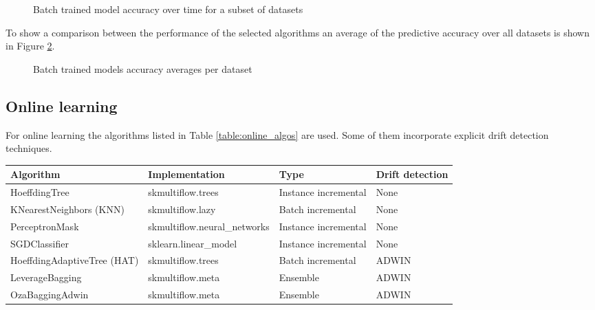 \documentclass{sig-alternate-br}
\begin{document}
\begin{figure}[h]
\centering 
{}
\caption{Batch trained model accuracy over time for a subset of datasets}
\label{fig:batchdt}
\end{figure}

To show a comparison between the performance of the selected algorithms an average of the predictive accuracy over all datasets is shown in Figure \ref{fig:batch_violins}.

\vspace{3cm}

\begin{figure}[h]
\centering 
{}
\caption{Batch trained models accuracy averages per dataset}
\label{fig:batch_violins}
\end{figure}

\subsection{Online learning}

For online learning the algorithms listed in Table \ref{table:online_algos} are used. Some of them incorporate explicit drift detection techniques. 

\begin{table*}[h]
\centering
\renewcommand{\arraystretch}{1.25}
\begin{tabular}{|l|l|l|l|} \hline
\textbf{Algorithm} & \textbf{Implementation} & \textbf{Type}  & \textbf{Drift detection} \\ \hline
HoeffdingTree & skmultiflow.trees &  Instance incremental & None \\ \hline
KNearestNeighbors (KNN) & skmultiflow.lazy & Batch incremental & None \\ \hline
PerceptronMask & skmultiflow.neural\_networks & Instance incremental & None \\ \hline
SGDClassifier & sklearn.linear\_model & Instance incremental &  None \\ \hline
HoeffdingAdaptiveTree (HAT) & skmultiflow.trees & Batch incremental & ADWIN \\ \hline
LeverageBagging  & skmultiflow.meta & Ensemble &  ADWIN \\ \hline
OzaBaggingAdwin & skmultiflow.meta & Ensemble & ADWIN \\ \hline
\end{tabular}
\caption{Classifiers used for online learning}
\label{table:online_algos}
\end{table*}
\end{document}
